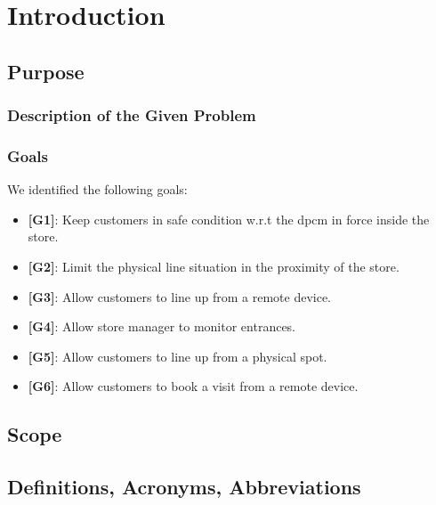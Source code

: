 \chapter{Introduction}

\section{Purpose}

\subsection{Description of the Given Problem}

\subsection{Goals}

We identified the following goals:

\begin{itemize}

	\item {\textbf{[G1]}}: Keep customers in safe condition w.r.t the \gls{dpcm} in force inside the store.
		
	\item {\textbf{[G2]}}: Limit the physical line situation in the proximity of the store.
		
	\item {\textbf{[G3]}}: Allow customers to line up from a remote device.
	
	\item {\textbf{[G4]}}: Allow store manager to monitor entrances.
	
	\item {\textbf{[G5]}}: Allow customers to line up from a physical spot.
	
	\item {\textbf{[G6]}}: Allow customers to book a visit from a remote
device.

	
\end{itemize}

\section{Scope}

\section{Definitions, Acronyms, Abbreviations}

